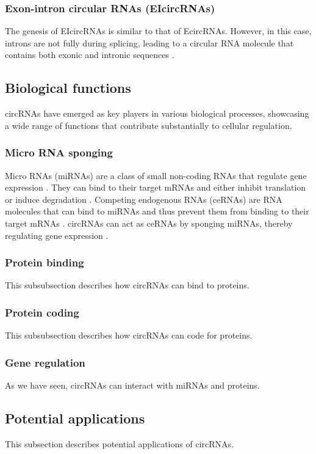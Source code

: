 \subsubsection{Exon-intron circular RNAs (EIcircRNAs)}
The genesis of EIcircRNAs is similar to that of EcircRNAs. However, in this
case, introns are not fully during splicing, leading to a circular RNA molecule
that contains both exonic and intronic sequences \supercite{xiao_circular_2022}.

\subsection{Biological functions}
circRNAs have emerged as key players in various biological processes, showcasing
a wide range of functions that contribute substantially to cellular regulation.

\subsubsection{Micro RNA sponging}
Micro RNAs (miRNAs) are a class of small non-coding RNAs that regulate gene
expression \supercite{bartel_micrornas_2009}. They can bind to their target
mRNAs and either inhibit translation or induce degradation
\supercite{bartel_micrornas_2009}. Competing endogenous RNAs (ceRNAs) are RNA
molecules that can bind to miRNAs and thus prevent them from binding to their
target mRNAs \supercite{tay_multilayered_2014}. circRNAs can act as ceRNAs by
sponging miRNAs, thereby regulating gene expression
\supercite{xiao_circular_2022}.

\subsubsection{Protein binding}
This subsubsection describes how circRNAs can bind to proteins.

\subsubsection{Protein coding}
This subsubsection describes how circRNAs can code for proteins.

\subsubsection{Gene regulation}
As we have seen, circRNAs can interact with miRNAs and proteins.

\subsection{Potential applications}
This subsection describes potential applications of circRNAs.

